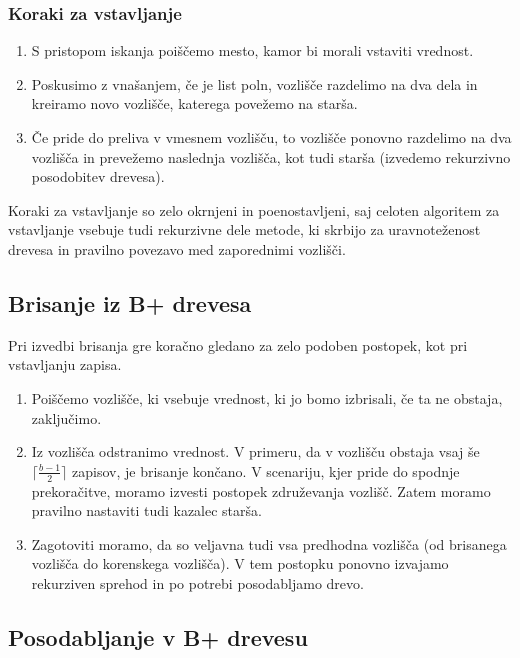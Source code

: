 \documentclass[a4paper,12pt,openright]{book}
\begin{document}
        \subsubsection{Koraki za vstavljanje}
        
        \begin{enumerate}
            \item S pristopom iskanja poiščemo mesto, kamor bi morali vstaviti vrednost.
            \item Poskusimo z vnašanjem, če je list poln, vozlišče razdelimo na dva dela in kreiramo novo vozlišče, katerega povežemo na starša.
            \item Če pride do preliva v vmesnem vozlišču, to vozlišče ponovno razdelimo na dva vozlišča in prevežemo naslednja vozlišča, kot tudi starša (izvedemo rekurzivno posodobitev drevesa).
        \end{enumerate}

        \noindent
        Koraki za vstavljanje so zelo okrnjeni in poenostavljeni, saj celoten algoritem za vstavljanje vsebuje tudi rekurzivne dele metode, ki skrbijo za uravnoteženost drevesa in pravilno povezavo med zaporednimi vozlišči.

        \subsection{Brisanje iz B+ drevesa}

        Pri izvedbi brisanja gre koračno gledano za zelo podoben postopek, kot pri vstavljanju zapisa.

        \begin{enumerate}
            \item Poiščemo vozlišče, ki vsebuje vrednost, ki jo bomo izbrisali, če ta ne obstaja, zaključimo.
            \item Iz vozlišča odstranimo vrednost. V primeru, da v vozlišču obstaja vsaj še $\lceil \frac{b - 1}{2}\rceil$ zapisov, je brisanje končano. V scenariju, kjer pride do spodnje prekoračitve, moramo izvesti postopek združevanja vozlišč. Zatem moramo pravilno nastaviti tudi kazalec starša.
            \item Zagotoviti moramo, da so veljavna tudi vsa predhodna vozlišča (od brisanega vozlišča do korenskega vozlišča). V tem postopku ponovno izvajamo rekurziven sprehod in po potrebi posodabljamo drevo.
        \end{enumerate}

        \subsection{Posodabljanje v B+ drevesu}
\end{document}
